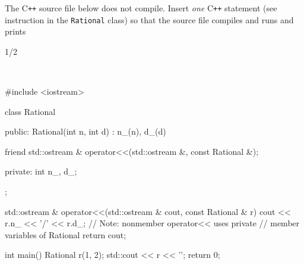

\nextq
The C\texttt{++} source file below does not compile.
Insert \textit{one} C\texttt{++} statement (see instruction in the
\texttt{Rational} class) so that the source file compiles and runs and prints
\begin{console}[fontsize=\footnotesize]
1/2
\end{console}
\\
\ANSWER
\begin{answercode}
#include <iostream>

class Rational
{
public:
    Rational(int n, int d)
        : n_(n), d_(d)
    {}

    friend std::ostream & operator<<(std::ostream &, const Rational &);
    
private:
    int n_, d_;
};

std::ostream & operator<<(std::ostream & cout, const Rational & r)
{
    cout << r.n_ << '/' << r.d_; // Note: nonmember operator<< uses private
                                 // member variables of Rational
    return cout;
}

int main()
{
    Rational r(1, 2);
    std::cout << r << '\n';
    return 0;
}
\end{answercode}



